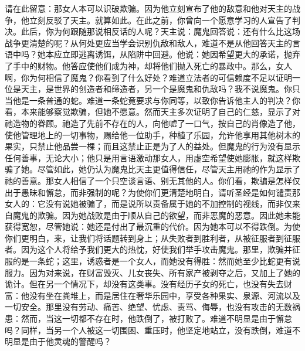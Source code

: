 请在此留意：那女人本可以识破欺骗。因为他立刻宣布了他的敌意和他对天主的战争，他立刻反驳了天主。就算如此。在此之前，你曾向一个愿意学习的人宣告了判决。此后，你为何跟随那说相反话的人呢？天主说：魔鬼回答说：还有什么比这场战争更清楚的呢？从何处更应当学会识别仇敌和敌人，难道不是从他回答天主的言语中吗？她本应立即逃离诱饵，从陷阱中回避。他说：她因希望更大的承诺，抛弃了手中的财物。他答应使他们成为神，却将他们抛入死亡的暴政中。那么，女人啊，你为何相信了魔鬼？你看到了什么好处？难道立法者的可信赖度不足以证明一位是天主，是世界的创造者和缔造者，另一个是魔鬼和仇敌吗？我不说魔鬼。你只当他是一条普通的蛇。难道一条蛇竟要求与你同等，以致你告诉他主人的判决？你看，本来能够察觉欺骗，但她不愿意。然而天主多次证明了自己的仁慈，显示了对祂造物的眷顾。祂造了先前不存在的人，向他嘘了一口气，按自己的肖像造了他，使他管理地上的一切事物，赐给他一位助手，种植了乐园，允许他享用其他树木的果实，只禁止他品尝一棵；而且这禁止正是为了人的益处。但魔鬼的行为没有显示任何善事，无论大小；他只是用言语激动那女人，用虚空希望使她膨胀，就这样欺骗了她。尽管如此，她仍认为魔鬼比天主更值得信任，尽管天主用祂的作为显示了祂的善意。那女人相信了一个只空谈言语、别无其他的人。你们看，欺骗是怎样仅出于愚昧和懈怠，而非强制的呢？为使你们更清楚地明白，请听圣经是如何谴责那女人的：它没有说她被骗了，而是说所以责备属于她的不加控制的视线，而非仅来自魔鬼的欺骗。因为她战败是由于顺从自己的欲望，而非恶魔的恶意。因此她未能获得宽恕，尽管她说：她还是付出了最沉重的代价。因为她本可以不得跌倒。为使你们更明白，来，让我们将话题转到身上；从失败者到胜利者，从被征服者到征服者。因为这个人将给予我们更大的热忱，好使我们举手攻击魔鬼。那里，欺骗并征服的是一条蛇；这里，诱惑者是一个女人，而她没有得胜：然而她至少比蛇更有说服力。因为对来说，在财富毁灭、儿女丧失、所有家产被剥夺之后，又加上了她的诡计。但在另一个情况下，却没有这类事。没有经历子女的死亡，也没有失去财富：他没有坐在粪堆上，而是居住在奢华乐园中，享受各种果实、泉源、河流以及一切安全。那里没有劳动、痛苦、绝望、忧虑、责骂、侮辱，也没有攻击的无数祸患：然而，当这一切都不存在时，他跌倒了，被打败了。难道不明显是由于懈怠吗？同样，当另一个人被这一切围困、重压时，他坚定地站立，没有跌倒，难道不明显是由于他灵魂的警醒吗？\par

